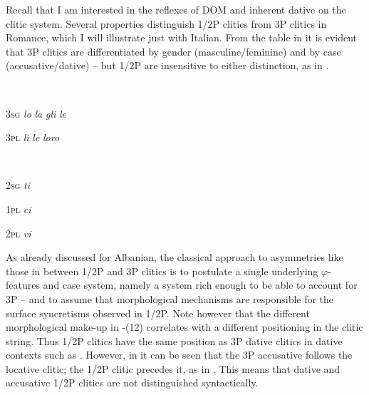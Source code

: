 \documentclass[output=paper]{langscibook}
\begin{document}
Recall that I am interested in the reflexes of DOM and inherent dative on the clitic system. {Several properties distinguish 1/2P clitics from 3P clitics in Romance, which I will illustrate just with Italian. From the table in  it is evident that 3P clitics are differentiated by gender (masculine/feminine) and by case (accusative/dative) – but 1/2P are insensitive to either distinction, as in .}

\ea\label{ex:key:}
{}\\
\z

\textsc{3sg}    \textit{lo}     \textit{la}     \textit{gli}     \textit{le}   


\textsc{3pl}    \textit{li}     \textit{le}     \textit{loro}  

\ea\label{ex:key:}
{}\\
\z

{\textsc{2sg}    \textit{ti}}



{\textsc{1pl}    \textit{ci}}


{\textsc{2pl}    \textit{vi}}

As already discussed for Albanian, the classical approach to asymmetries like those in  between 1/2P and 3P clitics is to postulate a single underlying $\varphi ${}-features and case system, namely a system rich enough to be able to account for 3P – and to assume that morphological mechanisms are responsible for the surface syncretisms observed in 1/2P. Note however that the different morphological make-up in -(12) correlates with a different positioning in the clitic string. Thus 1/2P clitics have the same position as 3P dative clitics in dative contexts such as . However, in  it can be seen that the 3P accusative follows the locative clitic; the 1/2P clitic precedes it, as in . This means that dative and accusative 1/2P clitics are not distinguished syntactically.

\ea\label{ex:key:}
{}\\
\z
\end{document}
